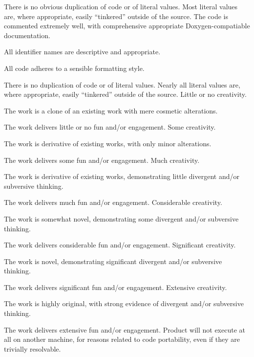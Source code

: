 \documentclass{../../fal_assignment}
\begin{document}
\begin{markingrubric}
             \par There is no obvious duplication of code or of literal values. Most literal values are, where appropriate, easily ``tinkered'' outside of the source.  
        \grade The code is commented extremely well, with comprehensive appropriate Doxygen-compatiable documentation.
            \par All identifier names are descriptive and appropriate.
            \par All code adheres to a sensible formatting style.
            \par There is no duplication of code or of literal values. Nearly all literal values are, where appropriate, easily ``tinkered'' outside of the source.  
%
        \grade\fail Little or no creativity.
            \par The work is a clone of an existing work with mere cosmetic alterations.
            \par The work delivers little or no fun and/or engagement.
        \grade Some creativity.
            \par The work is derivative of existing works, with only minor alterations.
            \par The work delivers some fun and/or engagement.
        \grade Much creativity.
            \par The work is derivative of existing works, demonstrating little divergent and/or subversive thinking.
            \par The work delivers much fun and/or engagement.
        \grade Considerable creativity.
            \par The work is somewhat novel, demonstrating some divergent and/or subversive thinking.
            \par The work delivers considerable fun and/or engagement.
        \grade Significant creativity.
            \par The work is novel, demonstrating significant divergent and/or subversive thinking.
            \par The work delivers significant fun and/or engagement.
        \grade Extensive creativity.
            \par The work is highly original, with strong evidence of divergent and/or subversive thinking.
            \par The work delivers extensive fun and/or engagement.
%
        \grade\fail Product will not execute at all on another machine, for reasons related to code portability, even if they are trivially resolvable.

\end{markingrubric}
\end{document}
